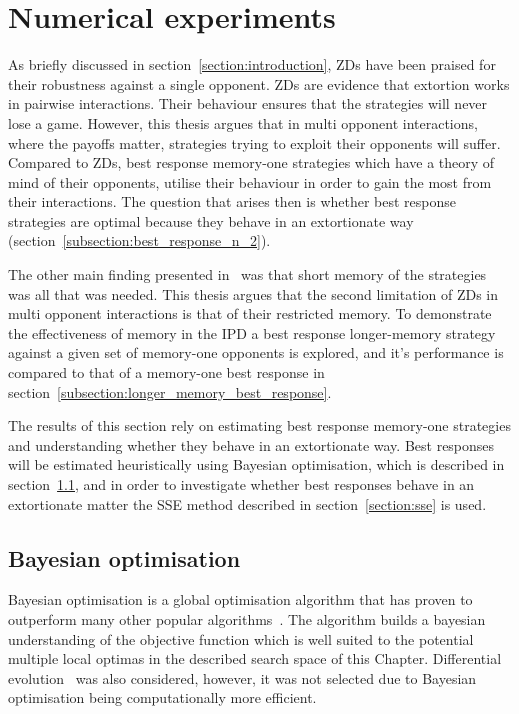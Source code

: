 \section{Numerical experiments} \label{section:numerical_experiments}

As briefly discussed in section~\ref{section:introduction}, ZDs have been
praised for their robustness against a single opponent. ZDs are evidence that
extortion works in pairwise interactions. Their behaviour ensures that the
strategies will never lose a game. However, this thesis argues that in multi
opponent interactions, where the payoffs matter, strategies trying to exploit
their opponents will suffer. Compared to ZDs, best response memory-one
strategies which have a theory of mind of their opponents, utilise their
behaviour in order to gain the most from their interactions. The question that
arises then is whether best response strategies are optimal because they behave
in an extortionate way (section~\ref{subsection:best_response_n_2}).

The other main finding presented in~\cite{Press2012} was that short memory of
the strategies was all that was needed. This thesis argues that the second
limitation of ZDs in multi opponent interactions is that of their restricted
memory. To demonstrate the effectiveness of memory in the IPD a best response
longer-memory strategy against a given set of memory-one opponents is explored,
and it's performance is compared to that of a memory-one best response in
section~\ref{subsection:longer_memory_best_response}.

The results of this section rely on estimating best response memory-one
strategies and understanding whether they behave in an extortionate way. Best
responses will be estimated heuristically using Bayesian optimisation, which is
described in section~\ref{section:bayesian_optimisation}, and in order to
investigate whether best responses behave in an extortionate matter the SSE
method described in section~\ref{section:sse} is used.

\subsection{Bayesian optimisation}\label{section:bayesian_optimisation}

Bayesian optimisation is a global optimisation
algorithm that has proven to outperform many other popular
algorithms~\cite{Jones2001}. The algorithm builds a bayesian understanding of
the objective function which is well suited to the potential multiple local optimas in
the described search space of this Chapter. Differential evolution~\cite{Storn1997}
was also considered, however, it was not selected due to Bayesian optimisation being
computationally more efficient.

